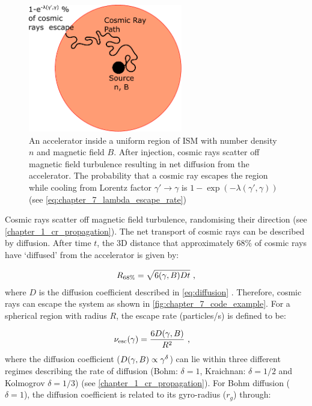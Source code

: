 \begin{figure}
    \centering
    \includegraphics[width=0.6\textwidth]{07_Particle_Evolution/Images/Code/code_example.pdf}
    \caption{An accelerator inside a uniform region of ISM with number density $n$ and magnetic field $B$. After injection, cosmic rays scatter off magnetic field turbulence resulting in net diffusion from the accelerator. The probability that a cosmic ray escapes the region while cooling from Lorentz factor $\gamma'\rightarrow\gamma$ is $1-\exp(-\lambda(\gamma',\gamma))$ (see \autoref{eq:chapter_7_lambda_escape_rate})}
    \label{fig:chapter_7_code_example}
\end{figure}

Cosmic rays scatter off magnetic field turbulence, randomising their direction (see \autoref{chapter_1_cr_propagation}). The net transport of cosmic rays can be described by diffusion. After time $t$, the 3D distance that approximately $68\%$ of cosmic rays have `diffused' from the accelerator is given by:

\begin{equation}
    \begin{aligned}
        R_{68\%}=\sqrt{6\qty(\gamma,B)Dt}\text{ ,}
    \end{aligned} \label{eq:chapter_7_6Dt}
\end{equation}
\noindent where $D$ is the diffusion coefficient described in \autoref{eq:diffusion} \citep{1996A&A...309..917A}. Therefore, cosmic rays can escape the system as shown in \autoref{fig:chapter_7_code_example}. For a spherical region with radius $R$, the escape rate (particles/s) is defined to be:

\begin{equation}
    \begin{aligned}
    \nu_\text{esc}\qty(\gamma)&=\frac{6D\qty(\gamma,B)}{R^2}\text{ ,}
    \end{aligned} \label{eq:chapter_7_escape_rate}
\end{equation}
\noindent where the diffusion coefficient ($D\qty(\gamma,B)\propto \gamma^\delta $) can lie within three different regimes describing the rate of diffusion (Bohm: $\delta=1$, Kraichnan: $\delta=1/2$ and Kolmogrov $\delta =1/3$) (see \autoref{chapter_1_cr_propagation}). \noindent For Bohm diffusion ($\delta=1$), the diffusion coefficient is related to its gyro-radius ($r_g$) through:

